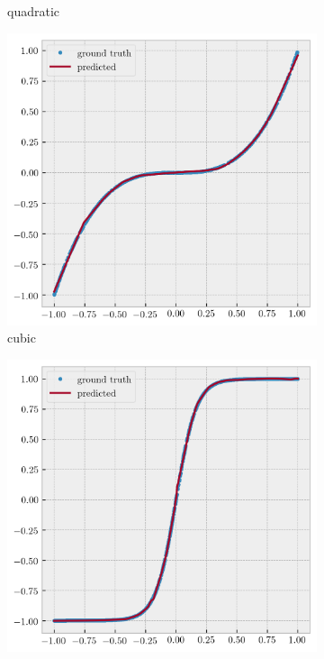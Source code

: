 \documentclass[12pt,a4paper]{article}
\begin{document}
\begin{figure}[htb]
\begin{subfigure}[h!]{0.3\textwidth}
		\caption{quadratic}
		\label{fig:quadratic}
	\end{subfigure}
	\begin{subfigure}[h!]{0.3\textwidth}
		\centering
		\includegraphics[width=\textwidth]{fit-3-pred.png}
		\caption{cubic}
		\label{fig:cubic}
	\end{subfigure}
	\begin{subfigure}[h!]{0.3\textwidth}
		\centering
		\includegraphics[width=\textwidth]{fit-tanh-pred.png}

\end{subfigure}
\end{figure}
\end{document}
